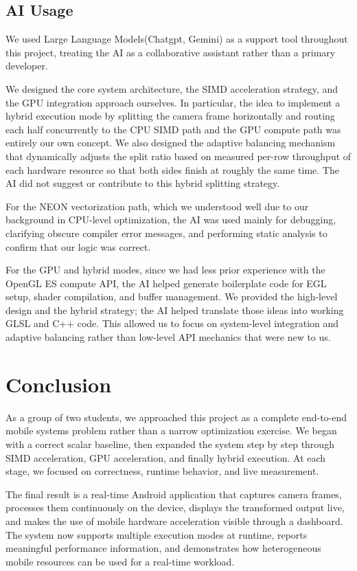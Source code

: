 \documentclass[12pt,a4paper]{article}
\begin{document}
\subsection{AI Usage}

We used Large Language Models(Chatgpt, Gemini) as a support tool throughout this project, treating the AI as a collaborative assistant rather than a primary developer.

We designed the core system architecture, the SIMD acceleration strategy, and the GPU integration approach ourselves. In particular, the idea to implement a hybrid execution mode by splitting the camera frame horizontally and routing each half concurrently to the CPU SIMD path and the GPU compute path was entirely our own concept. We also designed the adaptive balancing mechanism that dynamically adjusts the split ratio based on measured per-row throughput of each hardware resource so that both sides finish at roughly the same time. The AI did not suggest or contribute to this hybrid splitting strategy.

For the NEON vectorization path, which we understood well due to our background in CPU-level optimization, the AI was used mainly for debugging, clarifying obscure compiler error messages, and performing static analysis to confirm that our logic was correct.

For the GPU and hybrid modes, since we had less prior experience with the OpenGL ES compute API, the AI helped generate boilerplate code for EGL setup, shader compilation, and buffer management. We provided the high-level design and the hybrid strategy; the AI helped translate those ideas into working GLSL and C++ code. This allowed us to focus on system-level integration and adaptive balancing rather than low-level API mechanics that were new to us.

\section{Conclusion}

As a group of two students, we approached this project as a complete end-to-end mobile systems problem rather than a narrow optimization exercise. We began with a correct scalar baseline, then expanded the system step by step through SIMD acceleration, GPU acceleration, and finally hybrid execution. At each stage, we focused on correctness, runtime behavior, and live measurement.

The final result is a real-time Android application that captures camera frames, processes them continuously on the device, displays the transformed output live, and makes the use of mobile hardware acceleration visible through a dashboard. The system now supports multiple execution modes at runtime, reports meaningful performance information, and demonstrates how heterogeneous mobile resources can be used for a real-time workload.
\end{document}
